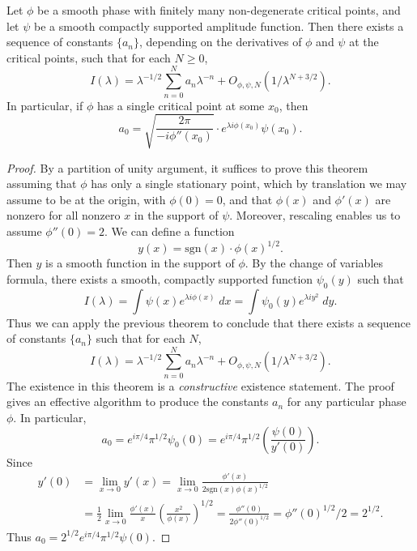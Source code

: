 \begin{theorem}
  Let $\phi$ be a smooth phase with finitely many non-degenerate critical points, and let $\psi$ be a smooth compactly supported amplitude function. Then there exists a sequence of constants $\{ a_n \}$, depending on the derivatives of $\phi$ and $\psi$ at the critical points, such that for each $N \geq 0$,
  \[ I(\lambda) = \lambda^{-1/2} \sum_{n = 0}^N a_n \lambda^{-n} + O_{\phi,\psi,N} ( 1/\lambda^{N+3/2} ). \]
  In particular, if $\phi$ has a single critical point at some $x_0$, then
  \[ a_0 = \sqrt{ \frac{2\pi}{-i \phi''(x_0)} } \cdot e^{\lambda i \phi(x_0)} \psi(x_0). \]
\end{theorem}
\begin{proof}
  By a partition of unity argument, it suffices to prove this theorem assuming that $\phi$ has only a single stationary point, which by translation we may assume to be at the origin, with $\phi(0) = 0$, and that $\phi(x)$ and $\phi'(x)$ are nonzero for all nonzero $x$ in the support of $\psi$. Moreover, rescaling enables us to assume $\phi''(0) = 2$. We can define a function
  \[ y(x) = \text{sgn}(x) \cdot \phi(x)^{1/2}. \]
  Then $y$ is a smooth function in the support of $\phi$. By the change of variables formula, there exists a smooth, compactly supported function $\psi_0(y)$ such that
  \[ I(\lambda) = \int \psi(x) e^{\lambda i \phi(x)}\; dx = \int \psi_0(y) e^{\lambda i y^2}\; dy. \]
  Thus we can apply the previous theorem to conclude that there exists a sequence of constants $\{ a_n \}$ such that for each $N$,
  \[ I(\lambda) = \lambda^{-1/2} \sum_{n = 0}^N a_n \lambda^{-n} + O_{\phi,\psi,N}(1/\lambda^{N+3/2}). \]
  The existence in this theorem is a \emph{constructive} existence statement. The proof gives an effective algorithm to produce the constants $a_n$ for any particular phase $\phi$. In particular,
  \[ a_0 = e^{i\pi/4} \pi^{1/2} \psi_0(0) = e^{i\pi/4} \pi^{1/2} \left( \frac{\psi(0)}{y'(0)} \right). \]
  Since
  \begin{align*}
    y'(0) &= \lim_{x \to 0} y'(x) = \lim_{x \to 0} \frac{\phi'(x)}{2 \text{sgn}(x) \phi(x)^{1/2}}\\
    &= \frac{1}{2} \lim_{x \to 0} \frac{\phi'(x)}{x} \left( \frac{x^2}{\phi(x)} \right)^{1/2} = \frac{\phi''(0)}{2 \phi''(0)^{1/2}} = \phi''(0)^{1/2}/2 = 2^{1/2}.
  \end{align*}
  Thus $a_0 = 2^{1/2} e^{i\pi/4} \pi^{1/2} \psi(0)$.
\end{proof}

